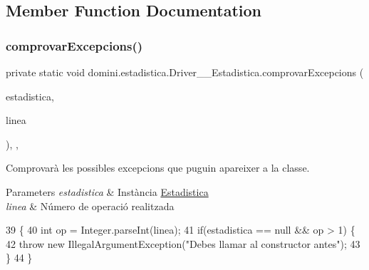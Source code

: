 \subsection{Member Function Documentation}
\mbox{\label{classdomini_1_1estadistica_1_1Driver____Estadistica_a3459f11af9841b23ac81a409a3e84e22}} 
\subsubsection{\texorpdfstring{comprovar\+Excepcions()}{comprovarExcepcions()}}
{\footnotesize\ttfamily private static void domini.\+estadistica.\+Driver\+\_\+\+\_\+\+Estadistica.\+comprovar\+Excepcions (\begin{DoxyParamCaption}\item[{\hyperlink{classdomini_1_1estadistica_1_1Estadistica}{Estadistica}}]{estadistica,  }\item[{String}]{linea }\end{DoxyParamCaption})\hspace{0.3cm}{\ttfamily [inline]}, {\ttfamily [static]}, {\ttfamily [private]}}



Comprovarà les possibles excepcions que puguin apareixer a la classe. 


\begin{DoxyParams}{Parameters}
{\em estadistica} & Instància \hyperlink{classdomini_1_1estadistica_1_1Estadistica}{Estadistica} \\
\hline
{\em linea} & Número de operació realitzada \\
\hline
\end{DoxyParams}

\begin{DoxyCode}
39                                                                                   \{
40         \textcolor{keywordtype}{int} op = Integer.parseInt(linea);
41         \textcolor{keywordflow}{if}(estadistica == null && op > 1) \{
42             \textcolor{keywordflow}{throw} \textcolor{keyword}{new} IllegalArgumentException(\textcolor{stringliteral}{"Debes llamar al constructor antes"});
43         \}
44     \}
\end{DoxyCode}
\mbox{\label{classdomini_1_1estadistica_1_1Driver____Estadistica_a7f11e0ccad919e427af9c591cf910bfe}} 
